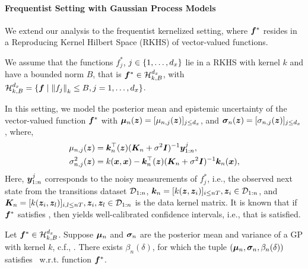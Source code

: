 \paragraph{Frequentist Setting with Gaussian Process Models}
We extend our analysis to the frequentist kernelized setting, where ${\bm{f}}^*$ resides in a Reproducing Kernel Hilbert Space (RKHS) of vector-valued functions.
\begin{assumption}
We assume that the functions $f^*_j$, $j \in \left\{1, \ldots, d_x\right\}$ lie in a RKHS with kernel $k$ and have a bounded norm $B$, that is ${\bm{f}}^* \in {\mathcal{H}}^{d_x}_{k, B}$, with ${\mathcal{H}}^{d_x}_{k, B} = \{{\bm{f}} \mid \left\lVert f_j\right\rVert_k \leq B, j=1, \dots, d_x\}$.
\label{ass:rkhs_func}
\end{assumption}
In this setting, we model the posterior mean and epistemic uncertainty of the vector-valued function ${\bm{f}}^*$ with ${\bm \mu}_n({\bm{z}}) = [\mu_{n,j} ({\bm{z}})]_{j\leq d_x}$, and ${\bm{\sigma}}_n({\bm{z}}) = [\sigma_{n,j} ({\bm{z}})]_{j\leq d_x}$, where,
\begin{equation}
\begin{aligned}
\label{eq:GPposteriors}
        \mu_{n,j} ({\bm{z}})& = {\bm{k}}_{n}^\top({\bm{z}})({\bm K}_{n} + \sigma^2 \bm{I})^{-1}{\bm{y}}_{1:n}^j,  \\
     \sigma^2_{n, j}({\bm{z}}) & =  k({\bm{x}}, {\bm{x}}) - {\bm k}^\top_{n}({\bm{z}})({\bm K}_{n}+\sigma^2 \bm{I})^{-1}{\bm k}_{n}({\bm{x}}),
\end{aligned}
\end{equation}
Here, ${\bm{y}}_{1:n}^j$ corresponds to the noisy measurements of $f^*_j$, i.e., the observed next state from the transitions dataset ${\mathcal{D}}_{1:n}$, ${\bm{k}}_n = [k({\bm{z}}, {\bm{z}}_i)]_{i\leq nT}, {\bm{z}}_i \in {\mathcal{D}}_{1:n}$, and $\bm{K}_n = [k({\bm{z}}_i, {\bm{z}}_l)]_{i, l\leq nT}, {\bm{z}}_i, {\bm{z}}_l \in {\mathcal{D}}_{1:n}$ is the data kernel matrix. 
It is known that if ${\bm{f}}^*$ satisfies , then  yields well-calibrated confidence intervals, i.e.,  that  is satisfied. 
\begin{lemma}
    Let ${\bm{f}}^* \in {\mathcal{H}}_{k,B}^{d_x}$.
Suppose ${{\bm{\mu}}}_n$ and ${\bm{\sigma}}_n$ are the posterior mean and variance of a GP with kernel $k$, c.f., .
There exists $\beta_n(\delta)$, for which the tuple $({\bm{\mu}}_n, {\bm{\sigma}}_n, \beta_n(\delta))$ satisfies~ w.r.t. function ${\bm{f}}^*$.
\label{lem:rkhs_confidence_interval}
\end{lemma}
